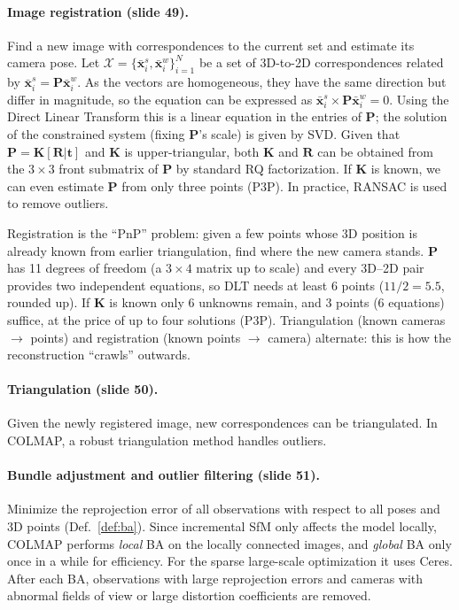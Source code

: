 \documentclass[11pt,a4paper]{article}
\theoremstyle{definition}
\theoremstyle{plain}
\theoremstyle{remark}
\begin{document}
\paragraph{Image registration (slide 49).} Find a new image with correspondences to the current set and estimate its camera pose. Let $\mathcal X=\{\bar{\bm x}^s_i,\bar{\bm x}^w_i\}_{i=1}^N$ be a set of 3D-to-2D correspondences related by $\bar{\bm x}^s_i=\bm P\bar{\bm x}^w_i$. As the vectors are homogeneous, they have the same direction but differ in magnitude, so the equation can be expressed as $\bar{\bm x}^s_i\times\bm P\bar{\bm x}^w_i=0$. Using the Direct Linear Transform this is a linear equation in the entries of $\bm P$; the solution of the constrained system (fixing $\bm P$'s scale) is given by SVD.
Given that $\bm P=\bm K[\bm R|\bm t]$ and $\bm K$ is upper-triangular, both $\bm K$ and $\bm R$ can be obtained from the $3\times3$ front submatrix of $\bm P$ by standard RQ factorization. If $\bm K$ is known, we can even estimate $\bm P$ from only three points (P3P). In practice, RANSAC is used to remove outliers.

\begin{intuition}
Registration is the ``PnP'' problem: given a few points whose 3D position is already known from earlier triangulation, find where the new camera stands. $\bm P$ has 11 degrees of freedom (a $3\times4$ matrix up to scale) and every 3D--2D pair provides two independent equations, so DLT needs at least 6 points ($11/2=5.5$, rounded up). If $\bm K$ is known only 6 unknowns remain, and 3 points (6 equations) suffice, at the price of up to four solutions (P3P). Triangulation (known cameras $\to$ points) and registration (known points $\to$ camera) alternate: this is how the reconstruction ``crawls'' outwards.
\end{intuition}

\paragraph{Triangulation (slide 50).} Given the newly registered image, new correspondences can be triangulated. In COLMAP, a robust triangulation method handles outliers.

\paragraph{Bundle adjustment and outlier filtering (slide 51).} Minimize the reprojection error of all observations with respect to all poses and 3D points (Def.~\ref{def:ba}). Since incremental SfM only affects the model locally, COLMAP performs \emph{local} BA on the locally connected images, and \emph{global} BA only once in a while for efficiency. For the sparse large-scale optimization it uses Ceres. After each BA, observations with large reprojection errors and cameras with abnormal fields of view or large distortion coefficients are removed.
\end{document}
